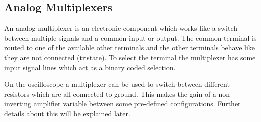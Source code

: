 \subsection{Analog Multiplexers}

An analog multiplexer is an electronic component which works like a switch between multiple signals and a common input or output. The common terminal is routed to one of the available other terminals and the other terminals behave like they are not connected (tristate). To select the terminal the multiplexer has some input signal lines which act as a binary coded selection.

On the oscilloscope a multiplexer can be used to switch between different resistors which are all connected to ground. This makes the gain of a non-inverting amplifier variable between some pre-defined configurations. Further details about this will be explained later.
